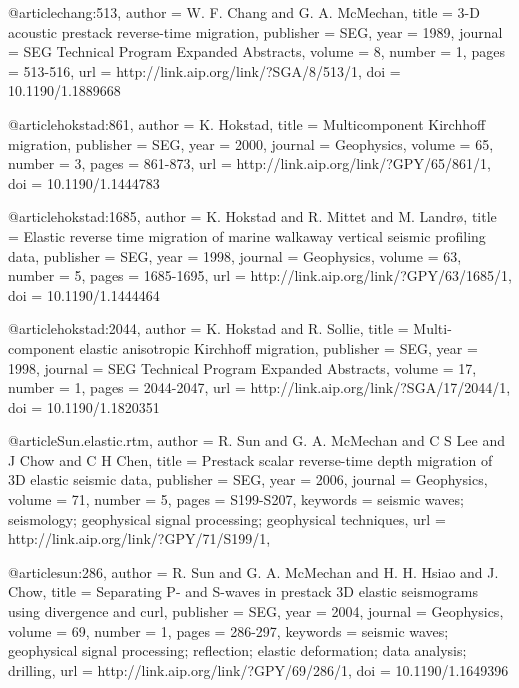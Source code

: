 {@article{chang:513,
  author =	 {W. F. Chang and G. A. McMechan},
  title =	 {3-{D} acoustic prestack reverse-time migration},
  publisher =	 {SEG},
  year =	 1989,
  journal =	 {SEG Technical Program Expanded Abstracts},
  volume =	 8,
  number =	 1,
  pages =	 {513-516},
  url =		 {http://link.aip.org/link/?SGA/8/513/1},
  doi =		 {10.1190/1.1889668}
}

@article{hokstad:861,
  author =	 {K. Hokstad},
  title =	 {Multicomponent {K}irchhoff migration},
  publisher =	 {SEG},
  year =	 2000,
  journal =	 {Geophysics},
  volume =	 65,
  number =	 3,
  pages =	 {861-873},
  url =		 {http://link.aip.org/link/?GPY/65/861/1},
  doi =		 {10.1190/1.1444783}
}

@article{hokstad:1685,
  author =	 {K. Hokstad and R. Mittet and M. Landr\o},
  title =	 {Elastic reverse time migration of marine walkaway
                  vertical seismic profiling data},
  publisher =	 {SEG},
  year =	 1998,
  journal =	 {Geophysics},
  volume =	 63,
  number =	 5,
  pages =	 {1685-1695},
  url =		 {http://link.aip.org/link/?GPY/63/1685/1},
  doi =		 {10.1190/1.1444464}
}

@article{hokstad:2044,
  author =	 {K. Hokstad and R. Sollie},
  title =	 {Multi-component elastic anisotropic {K}irchhoff
                  migration},
  publisher =	 {SEG},
  year =	 1998,
  journal =	 {SEG Technical Program Expanded Abstracts},
  volume =	 17,
  number =	 1,
  pages =	 {2044-2047},
  url =		 {http://link.aip.org/link/?SGA/17/2044/1},
  doi =		 {10.1190/1.1820351}
}

@article{Sun.elastic.rtm,
  author =	 {R. Sun and G. A. McMechan and C S Lee
                  and J Chow and C H Chen},
  title =	 {Prestack scalar reverse-time depth migration of 3{D}
                  elastic seismic data},
  publisher =	 {SEG},
  year =	 2006,
  journal =	 {Geophysics},
  volume =	 71,
  number =	 5,
  pages =	 {S199-S207},
  keywords =	 {seismic waves; seismology; geophysical signal
                  processing; geophysical techniques},
  url =		 {http://link.aip.org/link/?GPY/71/S199/1},
}

@article{sun:286,
  author =	 {R. Sun and G. A. McMechan and H. H. Hsiao
                  and J. Chow},
  title =	 {Separating {P}- and {S}-waves in prestack {3D}
                  elastic seismograms using divergence and curl},
  publisher =	 {SEG},
  year =	 2004,
  journal =	 {Geophysics},
  volume =	 69,
  number =	 1,
  pages =	 {286-297},
  keywords =	 {seismic waves; geophysical signal processing;
                  reflection; elastic deformation; data analysis;
                  drilling},
  url =		 {http://link.aip.org/link/?GPY/69/286/1},
  doi =		 {10.1190/1.1649396}
}

}
